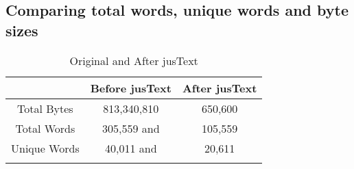 
\newpage 
\subsection{Comparing total words, unique words and byte sizes}


\begin{table}
\caption{Original and After jusText}
\begin{center}
  \begin{tabular}{ c | c | c }
    \hline
     & Before jusText & After jusText \\ \hline
Total Bytes & 813,340,810   &  650,600  \\ \hline
Total Words & 305,559 and & 105,559 \\ \hline
Unique Words & 40,011 and & 20,611 \\ 
\label{table:comparision}
 \end{tabular}
 \end{center}

\end{table}

